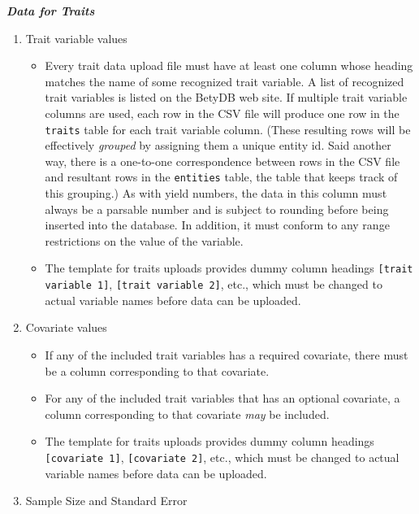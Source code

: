 \textbf{\textit{Data for Traits}}

\begin{enumerate}

\item Trait variable values

\begin{itemize}
\item Every trait data upload file must have at least one column whose heading
  matches the name of some recognized trait variable.  A list of
  recognized trait variables is listed on the BetyDB web site.  If
  multiple trait variable columns are used, each row in the CSV file will
  produce one row in the \verb|traits| table for each trait variable column.
  (These resulting rows will be effectively \textit{grouped} by assigning them a
  unique entity id.  Said another way, there is a one-to-one
  correspondence between rows in the CSV file and resultant rows in the
  \verb|entities| table, the table that keeps track of this grouping.)  As with
  yield numbers, the data in this column must always be a parsable number
  and is subject to rounding before being inserted into the database.  In
  addition, it must conform to any range restrictions on the value of the
  variable.
\item The template for traits uploads provides dummy column headings
\verb|[trait variable 1]|, \verb|[trait variable 2]|, etc., which must be changed to
   actual variable names before data can be uploaded.
\end{itemize}

\item Covariate values

\begin{itemize}
\item If any of the included trait variables has a required covariate, there
  must be a column corresponding to that covariate.
\item For any of the included trait variables that has an optional covariate, a
  column corresponding to that covariate \textit{may} be included.
\item The template for traits uploads provides dummy column headings
 \verb|[covariate 1]|, \verb|[covariate 2]|, etc., which must be changed to actual
 variable names before data can be uploaded.
 \end{itemize}
 
\item Sample Size and Standard Error


\end{enumerate}
